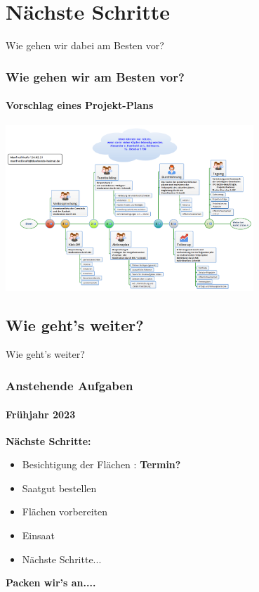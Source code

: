 \documentclass[aspectratio=169]{beamer}
\begin{document}
\section{Nächste Schritte}

\begin{frame}{Wie gehen wir dabei am Besten vor?}
\frametitle{Wie gehen wir am Besten vor?} 
\framesubtitle{Vorschlag eines Projekt-Plans}

\begin{center}
	
	\includegraphics[width=0.7\textwidth]{figures/Ablaufplan_png}
	
\end{center}

\end{frame}

\subsection[Aufgaben]{Wie geht's weiter?}

\begin{frame}{Wie geht's weiter?}
	\frametitle{Anstehende Aufgaben} 
	\framesubtitle{Frühjahr 2023}

	\textbf{Nächste Schritte:}\\
	\begin{itemize}
		\item 
			Besichtigung der Flächen : 
			\textbf{Termin?} \pause 
		\item 
			Saatgut bestellen \pause
		\item 
			Flächen vorbereiten \pause
		\item 
			Einsaat \pause
		\item 
			Nächste Schritte...%
	\end{itemize}
	\begin{center}
	\textbf{Packen wir's an....}	
	\end{center}
\end{frame}
\end{document}
